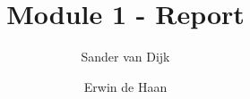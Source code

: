 \documentclass[final]{scrartcl} %
\title{Module 1 - Report}
\author{Sander {van Dijk} \and Erwin {de Haan}}
\begin{document}
\maketitle

\section{}
\end{document}
